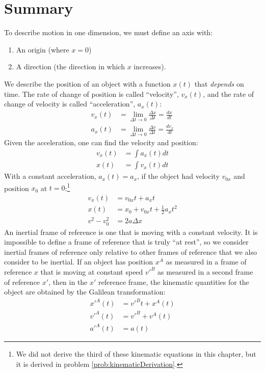 \newpage
\section{Summary}
\begin{chapterSummary}
To describe motion in one dimension, we must define an axis with:
\begin{enumerate}
\item An origin (where $x=0$)
\item A direction (the direction in which $x$ increases).
\end{enumerate}

We describe the position of an object with a function $x(t)$ that \textit{depends} on time. The rate of change of position is called ``velocity'', $v_x(t)$, and the rate of change of velocity is called ``acceleration'', $a_x(t)$:
\begin{align*}
v_x(t)&=\lim_{\Delta t\to 0}\frac{\Delta x}{\Delta t}=\frac{dx}{dt}\\
a_x(t)&=\lim_{\Delta t\to 0}\frac{\Delta v}{\Delta t}=\frac{dv_x}{dt}
\end{align*}
Given the acceleration, one can find the velocity and position:
\begin{align*}
v_x(t)&=\int a_x(t)dt\\
x(t)&=\int v_x(t)dt
\end{align*}
With a constant acceleration, $a_x(t)=a_x$, if the object had velocity $v_{0x}$ and position $x_0$ at $t=0$:\footnote{We did not derive the third of these kinematic equations in this chapter, but it is derived in problem \ref{prob:kinematicDerivation}.} 
\begin{align*}
v_x(t)&=v_{0x}t+a_xt\\
x(t)&=x_0+v_{0x}t+\frac{1}{2}a_xt^2\\
v^2-v_0^2&=2a\Delta x 
\end{align*}
An inertial frame of reference is one that is moving with a constant velocity. It is impossible to define a frame of reference that is truly ``at rest'', so we consider inertial frames of reference only relative to other frames of reference that we also consider to be inertial. If an object has position $x^A$ as measured in a frame of reference $x$ that is moving at constant speed $v'^B$ as measured in a second frame of reference $x'$, then in the $x'$ reference frame, the kinematic quantities for the object are obtained by the Galilean transformation:
\begin{align*}
x'^A(t) &= v'^Bt + x^A(t)\\
v'^A(t) &=v'^B+v^A(t)\\
a'^A(t) &= a(t)
\end{align*}
\end{chapterSummary}

